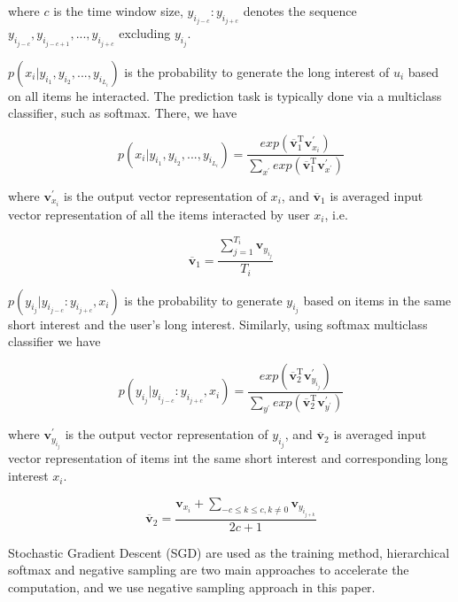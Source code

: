 \documentclass{llncs}
\begin{document}
where $c$ is the time window size, $y_{i_{j-c}} : y_{i_{j+c}}$ denotes the sequence
$y_{i_{j-c}}, y_{i_{j-c+1}}, ..., y_{i_{j+c}}$ excluding $y_{i_j}$.

$p(x_i | y_{i_1}, y_{i_2}, ..., y_{i_{L_i}})$ is the probability to generate
the long interest of $u_i$ based on all items he interacted.
The prediction task is typically done via a multiclass classifier,
such as softmax. There, we have

\begin{equation}
p(x_i | y_{i_1}, y_{i_2}, ..., y_{i_{L_i}}) =
\frac
{
	exp ( \overline{\mathbf{v}}_{1}^{\mathrm{T}} \mathbf{v}_{x_i}^{'} )
}
{
	\sum_{x^{'}} exp ( \overline{\mathbf{v}}_{1}^{\mathrm{T}} \mathbf{v}_{x^{'}}^{'} )
}
\end{equation}

where $\mathbf{v}_{x_i}^{'}$ is the output vector representation of $x_i$,
and $\overline{\mathbf{v}}_{1}$ is averaged input vector representation of all the items
interacted by user $x_i$, i.e.

\begin{equation}
\overline{\mathbf{v}}_{1} = \frac{\sum_{j=1}^{T_i} \mathbf{v}_{y_{i_j}}}{T_i}
\end{equation}

$p(y_{i_j} | y_{i_{j-c}} : y_{i_{j+c}}, x_i)$
is the probability to generate $y_{i_j}$ based on items in the same short interest
and the user's long interest. Similarly, using softmax multiclass classifier we have

\begin{equation}
p(y_{i_j} | y_{i_{j-c}} : y_{i_{j+c}}, x_i) =
\frac
{
	exp( \overline{\mathbf{v}}_{2}^{\mathrm{T}} \mathbf{v}_{y_{i_j}}^{'} )
}
{
	\sum_{y^{'}} exp( \overline{\mathbf{v}}_{2}^{\mathrm{T}} \mathbf{v}_{y^{'}}^{'} )
}
\end{equation}

where $\mathbf{v}_{y_{i_j}}^{'}$ is the output vector representation of $y_{i_j}$,
and $\overline{\mathbf{v}}_{2}$ is averaged input vector representation of items
int the same short interest and corresponding long interest $x_i$.

\begin{equation}
\overline{\mathbf{v}}_{2} = \frac{
	\mathbf{v}_{x_i} + 
	\sum_{-c \leq k \leq c, k \not= 0}{\mathbf{v}_{y_{i_{j+k}}}}
}{2c+1}
\end{equation}

Stochastic Gradient Descent (SGD) are used as the training method,
hierarchical softmax and negative sampling are two main approaches to accelerate
the computation, and we use negative sampling approach in this paper.
\end{document}
